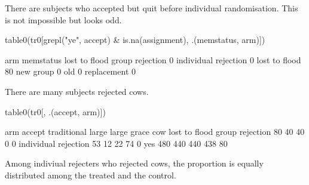 There are subjects who accepted but quit before individual randomisation. This is not impossible but looks odd.
\begin{Schunk}
\begin{Sinput}
table0(tr0[grepl("ye", accept) & is.na(assignment), .(memstatus, arm)])
\end{Sinput}
\begin{Soutput}
                      arm
memstatus              lost to flood
  group rejection                  0
  individual rejection             0
  lost to flood                   80
  new group                        0
  old                              0
  replacement                      0
\end{Soutput}
\end{Schunk}
There are many subjects rejected cows. 
\begin{Schunk}
\begin{Sinput}
table0(tr0[, .(accept, arm)])
\end{Sinput}
\begin{Soutput}
                      arm
accept                 traditional large large grace cow lost to flood
  group rejection               80    40          40   0             0
  individual rejection          53    12          22  74             0
  yes                          480   440         440 438            80
\end{Soutput}
\end{Schunk}
Among indiviual rejecters who rejected cows, the proportion is equally distributed among the treated and the control.
